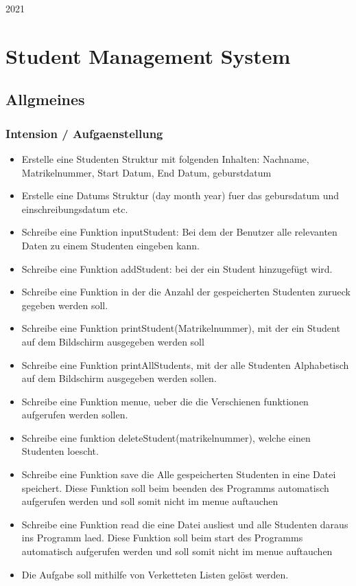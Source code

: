 \documentclass[a4paper, 11pt, oneside]{book} %
\begin{document}
\begin{titlepage}
	\vspace{0.3\baselineskip} 
	
	2021 

\end{titlepage}


\tableofcontents
\newpage

\chapter{Student Management System}

\section{Allgmeines} 
\subsection{Intension / Aufgaenstellung}
\begin{itemize}
\item Erstelle eine Studenten Struktur mit folgenden Inhalten: Nachname, Matrikelnummer, Start Datum, End Datum, geburstdatum
\item Erstelle eine Datums Struktur (day month year) fuer das gebursdatum und einschreibungsdatum etc.
\item Schreibe eine Funktion inputStudent: Bei dem der Benutzer alle relevanten Daten zu einem Studenten eingeben kann.
\item Schreibe eine Funktion addStudent: bei der ein Student hinzugefügt wird.
\item Schreibe eine Funktion in der die Anzahl der gespeicherten Studenten zurueck gegeben werden soll.
\item Schreibe eine Funktion printStudent(Matrikelnummer), mit der ein Student auf dem Bildschirm ausgegeben werden soll
\item Schreibe eine Funktion printAllStudents, mit der alle Studenten Alphabetisch auf dem Bildschirm ausgegeben werden sollen.
\item Schreibe eine Funktion menue, ueber die die Verschienen funktionen aufgerufen werden sollen.
\item Schreibe eine funktion deleteStudent(matrikelnummer), welche einen Studenten loescht.
\item Schreibe eine Funktion save die Alle gespeicherten Studenten in eine Datei speichert. Diese Funktion soll beim beenden des Programms automatisch aufgerufen werden und soll somit nicht im menue auftauchen
\item Schreibe eine Funktion read die eine Datei ausliest und alle Studenten daraus ins Programm laed. Diese Funktion soll beim start des Programms automatisch aufgerufen werden und soll somit nicht im menue auftauchen
\item Die Aufgabe soll mithilfe von Verketteten Listen gelöst werden.

\end{itemize}
\end{document}
